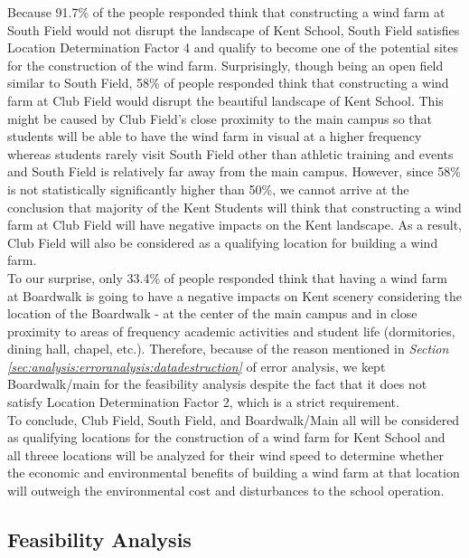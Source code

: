 \documentclass[review]{elsarticle}
\begin{document}
Because 91.7\% of the people responded think that constructing a wind farm at South Field would not disrupt the landscape of Kent School, 
South Field satisfies Location Determination Factor 4 and qualify to become one of the potential sites for the construction of the wind 
farm. Surprisingly, though being an open field similar to South Field, 58\% of people responded think that constructing a wind farm at Club 
Field would disrupt the beautiful landscape of Kent School. This might be caused by Club Field's close proximity to the main campus so that 
students will be able to have the wind farm in visual at a higher frequency whereas students rarely visit South Field other than athletic 
training and events and South Field is relatively far away from the main campus. However, since 58\% is not statistically significantly 
higher than 50\%, we cannot arrive at the conclusion that majority of the Kent Students will think that constructing a wind farm at Club 
Field will have negative impacts on the Kent landscape. As a result, Club Field will also be considered as a qualifying location for building 
a wind farm.
\\\indent To our surprise, only 33.4\% of people responded think that having a wind farm at Boardwalk is going to have a negative impacts on 
Kent scenery considering the location of the Boardwalk - at the center of the main campus and in close proximity to areas of frequency 
academic activities and student life (dormitories, dining hall, chapel, etc.). Therefore, because of the reason mentioned in \textit{Section \ref{sec:analysis:erroranalysis:datadestruction}} 
of error analysis, we kept Boardwalk/main for the feasibility analysis despite the fact that it does not satisfy Location Determination 
Factor 2, which is a strict requirement.
\\\indent To conclude, Club Field, South Field, and Boardwalk/Main all will be considered as qualifying locations for the construction of 
a wind farm for Kent School and all threee locations will be analyzed for their wind speed to determine whether the economic and environmental 
benefits of building a wind farm at that location will outweigh the environmental cost and disturbances to the school operation.


\subsection{Feasibility Analysis}
\end{document}
